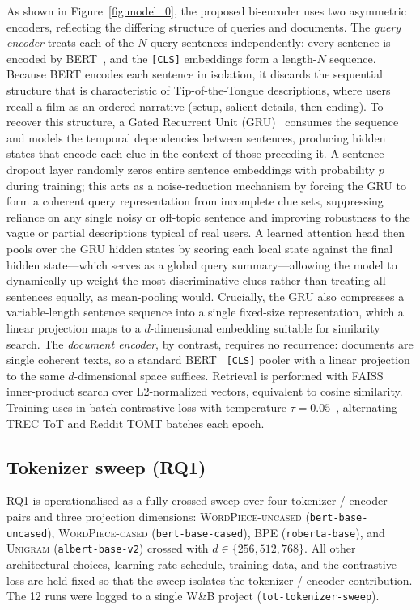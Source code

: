 \documentclass[conference]{IEEEtran}
\begin{document}
As shown in Figure~\ref{fig:model_0}, the proposed bi-encoder uses two asymmetric encoders, reflecting the differing structure of queries and documents. The \emph{query encoder} treats each of the $N$ query sentences independently: every sentence is encoded by BERT~\cite{devlin2019bert}, and the \texttt{[CLS]} embeddings form a length-$N$ sequence. Because BERT encodes each sentence in isolation, it discards the sequential structure that is characteristic of Tip-of-the-Tongue descriptions, where users recall a film as an ordered narrative (setup, salient details, then ending). To recover this structure, a Gated Recurrent Unit (GRU)~\cite{cho2014gru} consumes the sequence and models the temporal dependencies between sentences, producing hidden states that encode each clue in the context of those preceding it. A sentence dropout layer randomly zeros entire sentence embeddings with probability $p$ during training; this acts as a noise-reduction mechanism by forcing the GRU to form a coherent query representation from incomplete clue sets, suppressing reliance on any single noisy or off-topic sentence and improving robustness to the vague or partial descriptions typical of real users. A learned attention head then pools over the GRU hidden states by scoring each local state against the final hidden state---which serves as a global query summary---allowing the model to dynamically up-weight the most discriminative clues rather than treating all sentences equally, as mean-pooling would. Crucially, the GRU also compresses a variable-length sentence sequence into a single fixed-size representation, which a linear projection maps to a $d$-dimensional embedding suitable for similarity search. The \emph{document encoder}, by contrast, requires no recurrence: documents are single coherent texts, so a standard BERT~\cite{devlin2019bert} \texttt{[CLS]} pooler with a linear projection to the same $d$-dimensional space suffices. Retrieval is performed with FAISS~\cite{johnson2019faiss} inner-product search over L2-normalized vectors, equivalent to cosine similarity. Training uses in-batch contrastive loss with temperature $\tau = 0.05$~\cite{karpukhin2020dpr}, alternating TREC ToT and Reddit TOMT batches each epoch.

\subsection{Tokenizer sweep (RQ1)}
RQ1 is operationalised as a fully crossed sweep over four tokenizer /
encoder pairs and three projection dimensions:
\textsc{WordPiece-uncased} (\texttt{bert-base-uncased}),
\textsc{WordPiece-cased} (\texttt{bert-base-cased}),
\textsc{BPE} (\texttt{roberta-base}), and
\textsc{Unigram} (\texttt{albert-base-v2}) crossed with
$d \in \{256, 512, 768\}$. All other architectural choices, learning rate
schedule, training data, and the contrastive loss are held fixed so that
the sweep isolates the tokenizer / encoder contribution. The 12 runs were
logged to a single W\&B project (\texttt{tot-tokenizer-sweep}).
\end{document}
